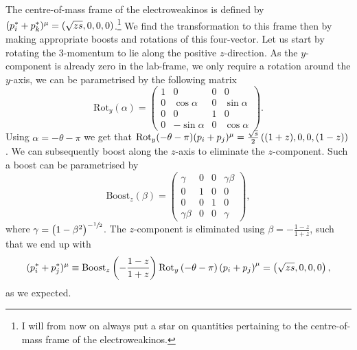 \documentclass[../main.tex]{subfiles}
\begin{document}
The centre-of-mass frame of the electroweakinos is defined by \((p^\ast_i +
p^\ast_k)\^{\mu} = \pclosed{\sqrt{zs}, 0, 0, 0}\).\footnote{I will from now on
  always put a star on quantities pertaining to the centre-of-mass frame
  of the
  electroweakinos.} We find the transformation to this frame then by making
appropriate boosts and rotations of this four-vector. Let us start by rotating
the 3-momentum to lie along the positive \(z\)-direction. As the
\(y\)-component is already zero in the lab-frame, we only require a rotation
around the \(y\)-axis, we can be parametrised by the following matrix
\begin{equation}
  \text{Rot}_y(\alpha) = \begin{pmatrix}
    1 & 0           & 0 & 0          \\
    0 & \cos\alpha  & 0 & \sin\alpha \\
    0 & 0           & 1 & 0          \\
    0 & -\sin\alpha & 0 & \cos\alpha
  \end{pmatrix}.
\end{equation}
Using \(\alpha = -\theta-\pi\) we get that \(\text{Rot}_y(-\theta-\pi) (p_i +
p_j)\^{\mu} = \frac{\sqrt{s}}{2} \pclosed{(1+z), 0, 0, (1-z)}\).
We can subsequently boost along the \(z\)-axis to eliminate the
\(z\)-component.
Such a boost can be parametrised by
\begin{equation}
  \text{Boost}_z(\beta) = \begin{pmatrix}
    \gamma      & 0 & 0 & \gamma\beta \\
    0           & 1 & 0 & 0           \\
    0           & 0 & 1 & 0           \\
    \gamma\beta & 0 & 0 & \gamma
  \end{pmatrix},
\end{equation}
where \(\gamma = \left(1 - \beta^2\right)^{-\sfrac{1}{2}}\).
The \(z\)-component is eliminated using \(\beta = -\frac{1-z}{1+z}\), such that
we end up with
\begin{equation}
  (p_i^\ast + p_j^\ast)\^\mu \equiv \text{Boost}_z\pclosed{-\frac{1-z}{1+z}} \text{Rot}_y\pclosed{-\theta-\pi} \pclosed{p_i + p_j}^\mu = \pclosed{\sqrt{zs}, 0, 0, 0},
\end{equation}
as we expected.
\end{document}

